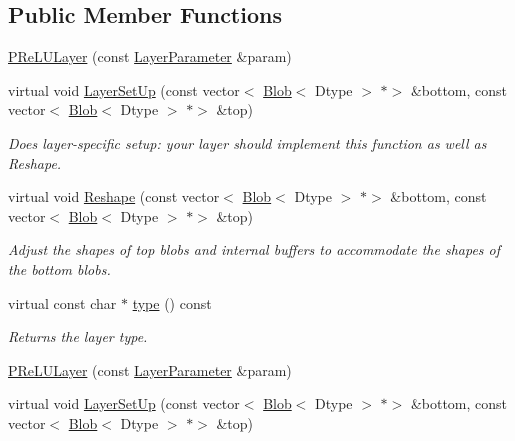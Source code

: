\subsection*{Public Member Functions}
\begin{DoxyCompactItemize}
\item 
\mbox{\hyperlink{classcaffe_1_1_p_re_l_u_layer_a9d164a537a2f77b4143d2491f4809732}{P\+Re\+L\+U\+Layer}} (const \mbox{\hyperlink{classcaffe_1_1_layer_parameter}{Layer\+Parameter}} \&param)
\item 
virtual void \mbox{\hyperlink{classcaffe_1_1_p_re_l_u_layer_a85e7207b664a4db8eb718f2075f44920}{Layer\+Set\+Up}} (const vector$<$ \mbox{\hyperlink{classcaffe_1_1_blob}{Blob}}$<$ Dtype $>$ $\ast$$>$ \&bottom, const vector$<$ \mbox{\hyperlink{classcaffe_1_1_blob}{Blob}}$<$ Dtype $>$ $\ast$$>$ \&top)
\begin{DoxyCompactList}\small\item\em Does layer-\/specific setup\+: your layer should implement this function as well as Reshape. \end{DoxyCompactList}\item 
virtual void \mbox{\hyperlink{classcaffe_1_1_p_re_l_u_layer_a50ad2070e060093556d1fc12f31e33b1}{Reshape}} (const vector$<$ \mbox{\hyperlink{classcaffe_1_1_blob}{Blob}}$<$ Dtype $>$ $\ast$$>$ \&bottom, const vector$<$ \mbox{\hyperlink{classcaffe_1_1_blob}{Blob}}$<$ Dtype $>$ $\ast$$>$ \&top)
\begin{DoxyCompactList}\small\item\em Adjust the shapes of top blobs and internal buffers to accommodate the shapes of the bottom blobs. \end{DoxyCompactList}\item 
\mbox{\label{classcaffe_1_1_p_re_l_u_layer_a9ce1a8cd35e8b7a891f6cb2646fc79b9}} 
virtual const char $\ast$ \mbox{\hyperlink{classcaffe_1_1_p_re_l_u_layer_a9ce1a8cd35e8b7a891f6cb2646fc79b9}{type}} () const
\begin{DoxyCompactList}\small\item\em Returns the layer type. \end{DoxyCompactList}\item 
\mbox{\hyperlink{classcaffe_1_1_p_re_l_u_layer_a9d164a537a2f77b4143d2491f4809732}{P\+Re\+L\+U\+Layer}} (const \mbox{\hyperlink{classcaffe_1_1_layer_parameter}{Layer\+Parameter}} \&param)
\item 
virtual void \mbox{\hyperlink{classcaffe_1_1_p_re_l_u_layer_ae4e9910b4258f17531cfe0c2229a7857}{Layer\+Set\+Up}} (const vector$<$ \mbox{\hyperlink{classcaffe_1_1_blob}{Blob}}$<$ Dtype $>$ $\ast$$>$ \&bottom, const vector$<$ \mbox{\hyperlink{classcaffe_1_1_blob}{Blob}}$<$ Dtype $>$ $\ast$$>$ \&top)

\end{DoxyCompactItemize}
